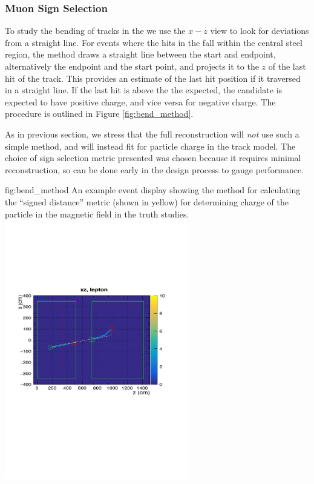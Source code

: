 \subsubsection{Muon Sign Selection}
To study the bending of tracks in the  we use the $x-z$ view to look for deviations from a straight line. For events where the hits in the  fall within the central steel region, the method draws a straight line between the  start and endpoint, alternatively the  endpoint and the  start point, and projects it to the $z$ of the last hit of the track. This provides an estimate of the last hit position if it traversed in a straight line. If the last hit is above the the expected, the candidate is expected to have positive charge, and vice versa for negative charge. The procedure is outlined in Figure \ref{fig:bend_method}. 

As in previous section, we stress that the full reconstruction will \emph{not} use such a simple method, and will instead fit for particle charge in the track model. The choice of sign selection metric presented was chosen because it requires minimal reconstruction, so can be done early in the  design process to gauge performance.
\begin{dunefigure}{fig:bend_method}
{An example event display showing the method for calculating the ``signed distance'' metric (shown in yellow) for determining charge of the particle in the magnetic field in the truth studies.}
\includegraphics[width=0.6\textwidth, clip, trim={0mm 90mm 0mm 70mm}]{graphics/tms/Simulation/Bend/pg_0012_signed_dist.pdf}
\end{dunefigure}

